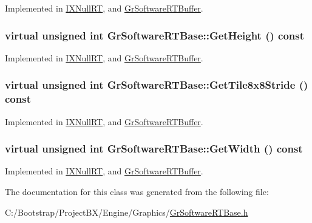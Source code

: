 Implemented in \hyperlink{class_i_x_null_r_t_9217a8a15e5fde56c766502cdb1cdf4f}{IXNullRT}, and \hyperlink{class_gr_software_r_t_buffer_7dd0b05522440e0b8112e974095ce0aa}{GrSoftwareRTBuffer}.\hypertarget{class_gr_software_r_t_base_28d12d92fea7b0a5891123fe7d5dfc74}{
\subsubsection[{GetHeight}]{\setlength{\rightskip}{0pt plus 5cm}virtual unsigned int GrSoftwareRTBase::GetHeight () const}}
\label{class_gr_software_r_t_base_28d12d92fea7b0a5891123fe7d5dfc74}




Implemented in \hyperlink{class_i_x_null_r_t_5b13ae270a175d81819b723ed179d509}{IXNullRT}, and \hyperlink{class_gr_software_r_t_buffer_72eb1f3acc53e88f3f89d79226c4e1f2}{GrSoftwareRTBuffer}.\hypertarget{class_gr_software_r_t_base_9ed681a9c06bd9657f75e7590bfee5ac}{
\subsubsection[{GetTile8x8Stride}]{\setlength{\rightskip}{0pt plus 5cm}virtual unsigned int GrSoftwareRTBase::GetTile8x8Stride () const}}
\label{class_gr_software_r_t_base_9ed681a9c06bd9657f75e7590bfee5ac}




Implemented in \hyperlink{class_i_x_null_r_t_798d86cbd68ba16bfbc2fa9b8cdbde1c}{IXNullRT}, and \hyperlink{class_gr_software_r_t_buffer_c0be8c165c3d4a9f110880704f6b2c42}{GrSoftwareRTBuffer}.\hypertarget{class_gr_software_r_t_base_f1b868a5ca1e7444a44c280e76bd802d}{
\subsubsection[{GetWidth}]{\setlength{\rightskip}{0pt plus 5cm}virtual unsigned int GrSoftwareRTBase::GetWidth () const}}
\label{class_gr_software_r_t_base_f1b868a5ca1e7444a44c280e76bd802d}




Implemented in \hyperlink{class_i_x_null_r_t_f4d16738ce92117b4417835a826b88d8}{IXNullRT}, and \hyperlink{class_gr_software_r_t_buffer_c61ed73f4c054a6b3b6cf98e37741f87}{GrSoftwareRTBuffer}.

The documentation for this class was generated from the following file:\begin{CompactItemize}
\item 
C:/Bootstrap/ProjectBX/Engine/Graphics/\hyperlink{_gr_software_r_t_base_8h}{GrSoftwareRTBase.h}\end{CompactItemize}
